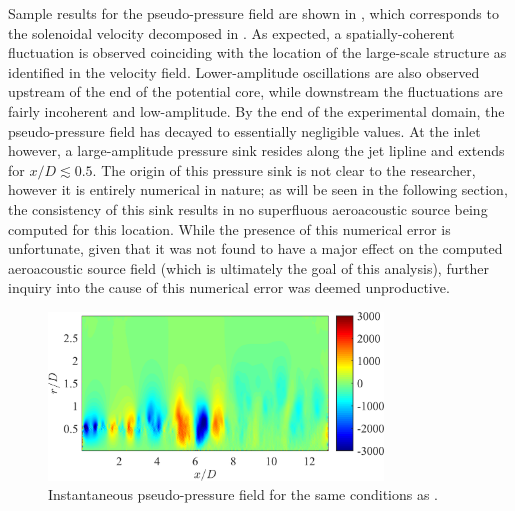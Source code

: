 Sample results for the pseudo-pressure field are shown in , which corresponds to the solenoidal velocity decomposed in .
As expected, a spatially-coherent fluctuation is observed coinciding with the location of the large-scale structure as identified in the velocity field.
Lower-amplitude oscillations are also observed upstream of the end of the potential core, while downstream the fluctuations are fairly incoherent and low-amplitude.
By the end of the experimental domain, the pseudo-pressure field has decayed to essentially negligible values.
At the inlet however, a large-amplitude pressure sink resides along the jet lipline and extends for $x/D \lesssim 0.5$.
The origin of this pressure sink is not clear to the researcher, however it is entirely numerical in nature; as will be seen in the following section, the consistency of this sink results in no superfluous aeroacoustic source being computed for this location.
While the presence of this numerical error is unfortunate, given that it was not found to have a major effect on the computed aeroacoustic source field (which is ultimately the goal of this analysis), further inquiry into the cause of this numerical error was deemed unproductive.
\begin{figure}
	\centering
	\includegraphics[width = 3.5in]{Figures/ch5_valid_Inst_ps.png}
	\caption{Instantaneous pseudo-pressure field for the same conditions as .}
	\label{fig:valid_pseudopressure}
\end{figure}
